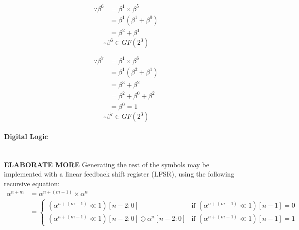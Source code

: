         \begin{minipage}[t]{0.5\textwidth}
            \begin{equation*}
                \begin{split}
                    \because \beta^{6} & = \beta^{1} \times \beta^{5} \\
                    & = \beta^{1} (\beta^{1}+\beta^{0}) \\
                    & = \beta^{2}+\beta^{1}
                \end{split}
            \end{equation*}
            \[ \therefore \beta^{6} \in GF(2^{3}) \]
        \end{minipage}
        \begin{minipage}[t]{0.5\textwidth}
            \begin{equation*}
                \begin{split}
                    \because \beta^{7} & = \beta^{1} \times \beta^{6} \\
                    & = \beta^{1} (\beta^{2}+\beta^{1}) \\
                    & = \beta^{3}+\beta^{2} \\
                    & = \beta^{2}+\beta^{0}+\beta^{2} \\
                    & = \beta^{0} = 1
                \end{split}
            \end{equation*}
            \[ \therefore \beta^{7} \in GF(2^{3}) \]
        \end{minipage}
        \newpage

        \paragraph{Digital Logic} \leavevmode \\ \textbf{ELABORATE MORE}
        Generating the rest of the symbols may be implemented with a linear
        feedback shift register (LFSR), using the following recursive equation:
        \begin{equation*}
            \begin{split}
                \alpha^{n+m} & =\alpha^{n+(m-1)}\times \alpha^{n} \\
                & = \begin{cases}
                        (\alpha^{n+(m-1)} \ll 1 )[n-2:0] & \text{if
                        $(\alpha^{n+(m-1)} \ll 1 )[n-1] = 0$} \\
                        (\alpha^{n+(m-1)} \ll 1 )[n-2:0] \oplus
                        \alpha^{n}[n-2:0] & \text{if $(\alpha^{n+(m-1)} \ll 1
                        )[n-1] = 1$}
                    \end{cases}
            \end{split}
        \end{equation*}
